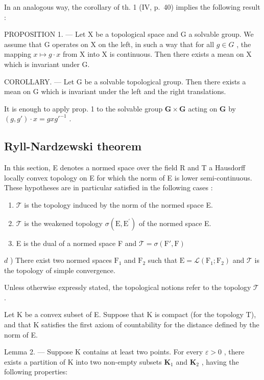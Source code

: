 In an analogous way, the corollary of th. 1 (IV, p.~40) implies the following result :

PROPOSITION 1. --- Let X be a topological space and G a solvable group. We assume that G operates on X on the left, in such a way that for all \(g \in G\) , the mapping \(x \mapsto g \cdot x\) from X into X is continuous. Then there exists a mean on X which is invariant under G.

COROLLARY. --- Let G be a solvable topological group. Then there exists a mean on G which is invariant under the left and the right translations.

It is enough to apply prop. 1 to the solvable group \(\mathbf{G} \times \mathbf{G}\) acting on \(\mathbf{G}\) by \((g, g') \cdot x = gxg'^{-1}\) .

\subsection{Ryll-Nardzewski theorem}

In this section, E denotes a normed space over the field R and T a Hausdorff locally convex topology on E for which the norm of E is lower semi-continuous. These hypotheses are in particular satisfied in the following cases :

\begin{enumerate}
\def\labelenumi{\alph{enumi})}
\item
  \(\mathcal{T}\) is the topology induced by the norm of the normed space E.
\item
  \(\mathcal{T}\) is the weakened topology \(\sigma (\mathrm{E},\mathrm{E}^{\prime})\) of the normed space E.
\item
  E is the dual of a normed space F and \(\mathcal{T} = \sigma (\mathrm{F}',\mathrm{F})\)
\end{enumerate}

\(d\) ) There exist two normed spaces \(\mathrm{F}_1\) and \(\mathrm{F}_2\) such that \(\mathrm{E} = \mathcal{L}(\mathrm{F}_1;\mathrm{F}_2)\) and \(\mathcal{T}\) is the topology of simple convergence.

Unless otherwise expressly stated, the topological notions refer to the topology \(\mathcal{T}\) .

Let K be a convex subset of E. Suppose that K is compact (for the topology T), and that K satisfies the first axiom of countability for the distance defined by the norm of E.

Lemma 2. --- Suppose K contains at least two points. For every \(\varepsilon > 0\) , there exists a partition of K into two non-empty subsets \(\mathbf{K}_1\) and \(\mathbf{K}_2\) , having the following properties:

